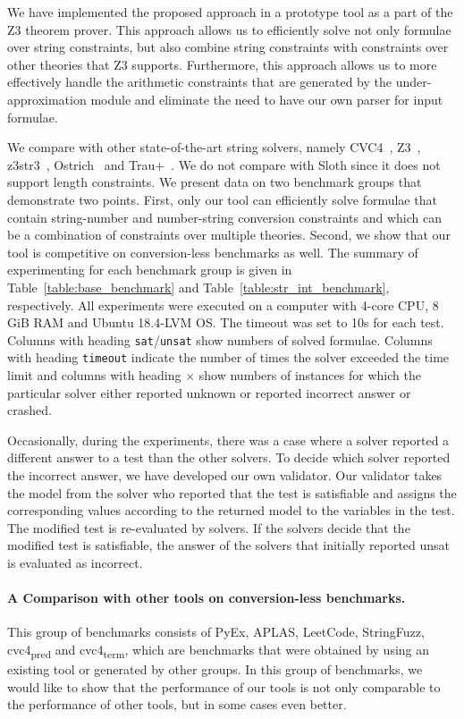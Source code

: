 We have implemented the proposed approach in a prototype tool \tool as a part of the Z3 theorem prover. This approach allows us to efficiently solve not only formulae over string constraints, but also combine string constraints with constraints over other theories that Z3 supports. Furthermore, this approach allows us to more effectively handle the arithmetic constraints that are generated by the under-approximation module and eliminate the need to have our own parser for input formulae.

We compare \tool with other state-of-the-art string solvers, namely CVC4~\cite{cvc4Tool}, Z3~\cite{z3}, \textsf{z3str3}~\cite{zheng2013z3}, Ostrich~\cite{chen2019decision} and \textsf{Trau+}~\cite{parosh2019chain}. We do not compare with Sloth \cite{sloth} since it does not support length constraints. We present data on two benchmark groups that demonstrate two points. First, only our tool can efficiently solve formulae that contain string-number and number-string conversion constraints and which can be a combination of constraints over multiple theories. Second, we show that our tool is competitive on conversion-less benchmarks as well. The summary of experimenting for each benchmark group is given in Table~\ref{table:base_benchmark} and Table~\ref{table:str_int_benchmark}, respectively. All experiments were executed on a computer with 4-core CPU, 8 GiB RAM and Ubuntu 18.4-LVM OS. The timeout was set to 10s for each test. Columns with heading \texttt{sat}/\texttt{unsat} show numbers of solved formulae. Columns with heading \texttt{timeout} indicate the number of times the solver exceeded the time limit and columns with heading $\times$ show numbers of instances for which the particular solver either reported unknown or reported incorrect answer or crashed.

Occasionally, during the experiments, there was a case where a solver reported a different answer to a test than the other solvers. To decide which solver reported the incorrect answer, we have developed our own validator. Our validator takes the model from the solver who reported that the test is satisfiable and assigns the corresponding values according to the returned model to the variables in the test. The modified test is re-evaluated by solvers. If the solvers decide that the modified test is satisfiable, the answer of the solvers that initially reported unsat is evaluated as incorrect.

\paragraph{A Comparison with other tools on conversion-less benchmarks.}
This group of benchmarks consists of PyEx, APLAS, LeetCode, StringFuzz, cvc4\textsubscript{pred} and cvc4\textsubscript{term}, which are benchmarks that were obtained by using an existing tool or generated by other groups. In this group of benchmarks, we would like to show that the performance of our tools is not only comparable to the performance of other tools, but in some cases even better.

